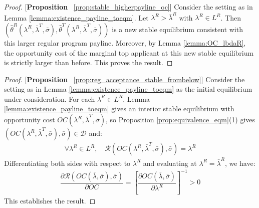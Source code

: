 \begin{proof}{[\textbf{Proposition} ~\ref{prop:stable_higherpayline_oc}]} Consider the setting as in Lemma \ref{lemma:existence_payline_toeqm}. Let $\lambda^R>\bar{\lambda}^R$ with $\lambda^R\in L^R$. Then $(\hat{\theta}^R(\lambda^R,\bar{\lambda}^T,\bar{\sigma}), \hat{\theta}^T(\lambda^R,\bar{\lambda}^T,\bar{\sigma}))$ is a new stable equilibrium consistent with this larger regular program payline. Moreover, by Lemma \ref{lemma:OC_lbdaR}, the opportunity cost of the marginal top applicant at this new stable equilibrium is strictly larger than before. This proves the result. 
\end{proof}





\begin{proof}{[\textbf{Proposition} ~\ref{prop:reg_acceptance_stable_frombelow}]}
Consider the setting as in Lemma \ref{lemma:existence_payline_toeqm} as the initial equilibrium under consideration. For each $\lambda^R\in L^R$, Lemma \ref{lemma:existence_payline_toeqm} gives an interior stable equilibrium with opportunity cost $OC(\lambda^R,\bar{\lambda}^T,\bar{\sigma})$, so Proposition \ref{prop:equivalence_eqm}(1) gives $(OC(\lambda^R,\bar{\lambda}^T,\bar{\sigma}),\bar{\sigma})\in\mathcal{D}$ and:
\begin{align*}
  \forall \lambda^R\in L^R,\quad \mathcal{R}(OC(\lambda^R,\bar{\lambda}^T,\bar{\sigma}),\bar{\sigma}) = \lambda^R
\end{align*}
Differentiating both sides with respect to $\lambda^R$ and evaluating at $\lambda^R = \bar{\lambda}^R$, we have:
\begin{align*}
    \dfrac{\partial \mathcal{R}(OC(\bar{\lambda},\bar{\sigma}),\bar{\sigma})}{\partial OC} = \left[\dfrac{\partial OC(\bar{\lambda},\bar{\sigma})}{\partial \lambda^R}\right]^{-1} >0
\end{align*}
This establishes the result. 
\end{proof}


